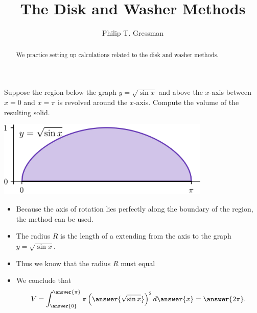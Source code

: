 \documentclass{ximera}
\title{The Disk and Washer Methods}
\author{Philip T. Gressman}
\begin{document}
\begin{abstract}
  We practice setting up calculations related to the disk and washer methods.
\end{abstract}
\maketitle

\begin{example}
Suppose the region below the graph $y = \sqrt{\sin x}$ and above the $x$-axis between $x=0$ and $x=\pi$ is revolved around the $x$-axis. Compute the volume of the resulting solid.
\begin{center}
\begin{image}
\includegraphics[width=4in]{diskwasher/disksin.png}
\end{image}
\end{center}
\begin{itemize}
\item Because the axis of rotation lies perfectly along the boundary of the region, the  method can be used.
\item The radius $R$ is the length of a  extending from the axis to the graph $y = \sqrt{\sin x}$.
\item Thus we know that the radius $R$ must equal
\begin{multipleChoice}\end{multipleChoice}
\item We conclude that
\[ V = \int_{\answer{0}}^{\answer{\pi}} \pi \left( \answer{\sqrt{\sin x}} \right)^2 d\answer{x} = \answer{2\pi}. \]
\end{itemize}
\end{example}
\end{document}
